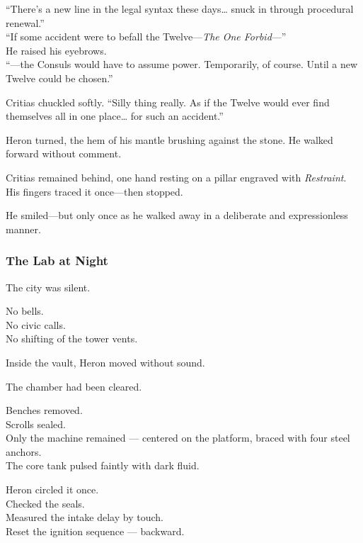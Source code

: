 \documentclass[12pt]{article}
\begin{document}
“There’s a new line in the legal syntax these days… snuck in through procedural renewal.”\\
“If some accident were to befall the Twelve—\textit{The One Forbid}—” \\
He raised his eyebrows.\\
“—the Consuls would have to assume power. Temporarily, of course. Until a new Twelve could be chosen.”

Critias chuckled softly.  
“Silly thing really. As if the Twelve would ever find themselves all in one place… for such an accident.”

\vspace{1em}

Heron turned, the hem of his mantle brushing against the stone.  
He walked forward without comment.

Critias remained behind, one hand resting on a pillar engraved with \textit{Restraint}.\\
His fingers traced it once—then stopped.

\vspace{1em}

He smiled—but only once as he walked away in a deliberate and expressionless manner.

\dotfill

\subsubsection{The Lab at Night}

The city was silent.

No bells.\\
No civic calls.\\
No shifting of the tower vents.

Inside the vault, Heron moved without sound.

\vspace{1em}

The chamber had been cleared.

Benches removed.\\
Scrolls sealed.\\
Only the machine remained — centered on the platform, braced with four steel anchors.\\
The core tank pulsed faintly with dark fluid.

Heron circled it once.\\
Checked the seals.\\
Measured the intake delay by touch.\\
Reset the ignition sequence — backward.
\end{document}
